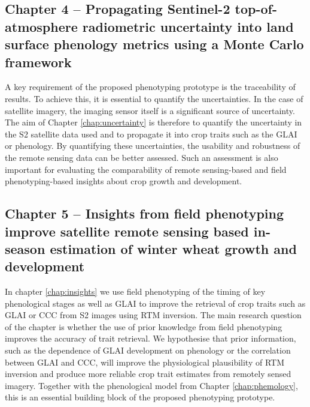 \subsection*{Chapter 4 -- Propagating Sentinel-2 top-of-atmosphere radiometric uncertainty into land surface phenology metrics using a Monte Carlo framework}
A key requirement of the proposed phenotyping prototype is the traceability of results. To achieve this, it is essential to quantify the uncertainties. In the case of satellite imagery, the imaging sensor itself is a significant source of uncertainty. The aim of Chapter \ref{chap:uncertainty} is therefore to quantify the uncertainty in the \gls{S2} satellite data used and to propagate it into crop traits such as the \gls{GLAI} or phenology. By quantifying these uncertainties, the usability and robustness of the remote sensing data can be better assessed. Such an assessment is also important for evaluating the comparability of remote sensing-based and field phenotyping-based insights about crop growth and development.

\subsection*{Chapter 5 -- Insights from field phenotyping improve satellite remote sensing based in-season estimation of winter wheat growth and development}
In chapter \ref{chap:insights} we use field phenotyping of the timing of key phenological stages as well as \gls{GLAI} to improve the retrieval of crop traits such as \gls{GLAI} or \gls{CCC} from \gls{S2} images using \gls{RTM} inversion. The main research question of the chapter is whether the use of prior knowledge from field phenotyping improves the accuracy of trait retrieval. We hypothesise that prior information, such as the dependence of \gls{GLAI} development on phenology or the correlation between \gls{GLAI} and \gls{CCC}, will improve the physiological plausibility of \gls{RTM} inversion and produce more reliable crop trait estimates from remotely sensed imagery. Together with the phenological model from Chapter \ref{chap:phemology}, this is an essential building block of the proposed phenotyping prototype.

